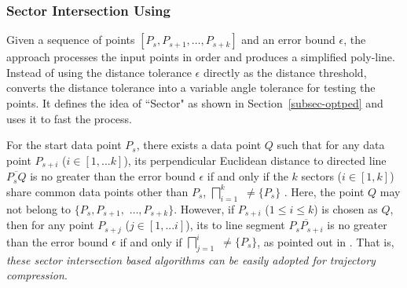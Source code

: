 \vspace{-0.5ex}
\subsubsection {Sector Intersection Using \ped}
\label{sec-siped}

Given a sequence of points $[P_{s}, P_{s+1}, \ldots, P_{s+k}]$ and an error bound $\epsilon$, the \siped approach processes the input points in order and produces a simplified poly-line. Instead of using the distance tolerance $\epsilon$ directly as the distance threshold, \siped converts the distance tolerance into a variable angle tolerance for testing the points. It defines the idea of ``Sector" as shown in Section~\ref{subsec-optped} and uses it to fast the process.

For the start data point $P_s$, 
there exists a data point $Q$ such that for any data point $P_{s+i}$ ($i \in [1, ... k]$), its perpendicular Euclidean distance to
directed line $\overline{P_sQ}$ is no greater than the error bound $\epsilon$ if and only if the $k$ sectors  ($i\in[1,k]$) share common data points other than $P_s$, \ie $\bigsqcap_{i=1}^{k}$ $\ne \{P_s\}$ \cite{Williams:Longest, Sklansky:Cone,Zhao:Sleeve}.
%
Here, the point $Q$ may not belong to $\{P_{s}, P_{s+1},$ $\ldots, P_{s+k}\}$.
However, if $P_{s+i}$ ($1\le i\le k$) is chosen as $Q$, then
for any point $P_{s+j}$ ($j \in [1, ... i]$), its \ped to
line segment $\overline{P_sP_{s+i}}$ is no greater than the error bound $\epsilon$ if and only if $\bigsqcap_{j=1}^{i}$ $\ne \{P_s\}$, as pointed out in \cite{Zhao:Sleeve}. 
That is, {\em these sector intersection based algorithms can be easily adopted for trajectory compression}.

